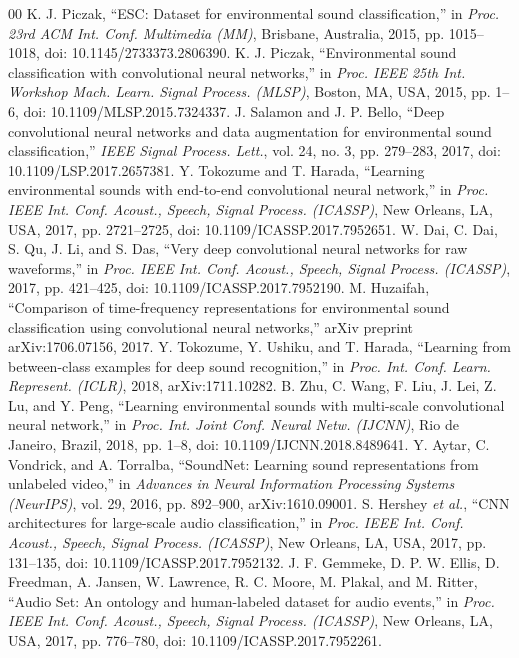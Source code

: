 \documentclass[conference]{IEEEtran}
\begin{document}
\begin{thebibliography}{00}
 K. J. Piczak, ``ESC: Dataset for environmental sound classification,'' in \textit{Proc. 23rd ACM Int. Conf. Multimedia (MM)}, Brisbane, Australia, 2015, pp. 1015--1018, doi: 10.1145/2733373.2806390.
 K. J. Piczak, ``Environmental sound classification with convolutional neural networks,'' in \textit{Proc. IEEE 25th Int. Workshop Mach. Learn. Signal Process. (MLSP)}, Boston, MA, USA, 2015, pp. 1--6, doi: 10.1109/MLSP.2015.7324337.
 J. Salamon and J. P. Bello, ``Deep convolutional neural networks and data augmentation for environmental sound classification,'' \textit{IEEE Signal Process. Lett.}, vol. 24, no. 3, pp. 279--283, 2017, doi: 10.1109/LSP.2017.2657381.
 Y. Tokozume and T. Harada, ``Learning environmental sounds with end-to-end convolutional neural network,'' in \textit{Proc. IEEE Int. Conf. Acoust., Speech, Signal Process. (ICASSP)}, New Orleans, LA, USA, 2017, pp. 2721--2725, doi: 10.1109/ICASSP.2017.7952651.
 W. Dai, C. Dai, S. Qu, J. Li, and S. Das, ``Very deep convolutional neural networks for raw waveforms,'' in \textit{Proc. IEEE Int. Conf. Acoust., Speech, Signal Process. (ICASSP)}, 2017, pp. 421--425, doi: 10.1109/ICASSP.2017.7952190.
 M. Huzaifah, ``Comparison of time-frequency representations for environmental sound classification using convolutional neural networks,'' arXiv preprint arXiv:1706.07156, 2017.
 Y. Tokozume, Y. Ushiku, and T. Harada, ``Learning from between-class examples for deep sound recognition,'' in \textit{Proc. Int. Conf. Learn. Represent. (ICLR)}, 2018, arXiv:1711.10282.
 B. Zhu, C. Wang, F. Liu, J. Lei, Z. Lu, and Y. Peng, ``Learning environmental sounds with multi-scale convolutional neural network,'' in \textit{Proc. Int. Joint Conf. Neural Netw. (IJCNN)}, Rio de Janeiro, Brazil, 2018, pp. 1--8, doi: 10.1109/IJCNN.2018.8489641.
 Y. Aytar, C. Vondrick, and A. Torralba, ``SoundNet: Learning sound representations from unlabeled video,'' in \textit{Advances in Neural Information Processing Systems (NeurIPS)}, vol. 29, 2016, pp. 892--900, arXiv:1610.09001.
 S. Hershey \textit{et al.}, ``CNN architectures for large-scale audio classification,'' in \textit{Proc. IEEE Int. Conf. Acoust., Speech, Signal Process. (ICASSP)}, New Orleans, LA, USA, 2017, pp. 131--135, doi: 10.1109/ICASSP.2017.7952132.
 J. F. Gemmeke, D. P. W. Ellis, D. Freedman, A. Jansen, W. Lawrence, R. C. Moore, M. Plakal, and M. Ritter, ``Audio Set: An ontology and human-labeled dataset for audio events,'' in \textit{Proc. IEEE Int. Conf. Acoust., Speech, Signal Process. (ICASSP)}, New Orleans, LA, USA, 2017, pp. 776--780, doi: 10.1109/ICASSP.2017.7952261.

\end{thebibliography}
\end{document}
